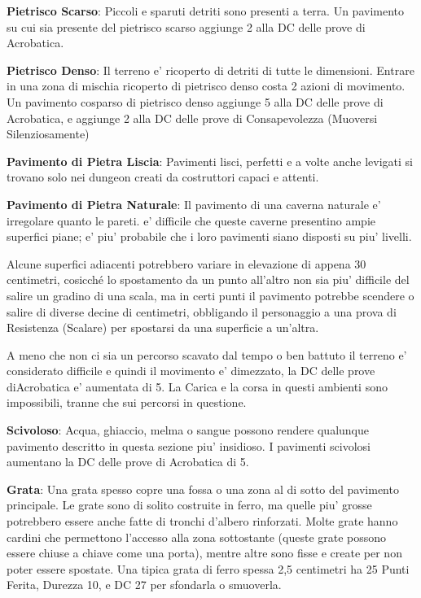 \documentclass[a4paper,11pt,twoside,openany]{dndbook}
\begin{document}
{\textbf{Pietrisco Scarso}: Piccoli e sparuti detriti sono presenti a terra. Un pavimento su cui sia presente del pietrisco scarso aggiunge 2 alla DC delle prove di Acrobatica.

\textbf{Pietrisco Denso}: Il terreno e' ricoperto di detriti di tutte le dimensioni. Entrare in una zona di mischia ricoperto di pietrisco denso costa 2 azioni di movimento. Un pavimento cosparso di pietrisco denso aggiunge 5 alla DC delle prove di Acrobatica, e aggiunge 2 alla DC delle prove di Consapevolezza (Muoversi Silenziosamente)

\textbf{Pavimento di Pietra Liscia}: Pavimenti lisci, perfetti e a volte anche levigati si trovano solo nei dungeon creati da costruttori capaci e attenti.

\textbf{Pavimento di Pietra Naturale}: Il pavimento di una caverna naturale e' irregolare quanto le pareti. e' difficile che queste caverne presentino ampie superfici piane; e' piu' probabile che i loro pavimenti siano disposti su piu' livelli. 

Alcune superfici adiacenti potrebbero variare in elevazione di appena 30 centimetri, cosicché lo spostamento da un punto all'altro non sia piu' difficile del salire un gradino di una scala, ma in certi punti il pavimento potrebbe scendere o salire di diverse decine di centimetri, obbligando il personaggio a una prova di Resistenza (Scalare) per spostarsi da una superficie a un'altra.

A meno che non ci sia un percorso scavato dal tempo o ben battuto il terreno e' considerato difficile e quindi il movimento e' dimezzato, la DC delle prove diAcrobatica e' aumentata di 5. La Carica e la corsa in questi ambienti sono impossibili, tranne che sui percorsi in questione.

\textbf{Scivoloso}: Acqua, ghiaccio, melma o sangue possono rendere qualunque pavimento descritto in questa sezione piu' insidioso. I pavimenti scivolosi aumentano la DC delle prove di Acrobatica di 5.

\textbf{Grata}: Una grata spesso copre una fossa o una zona al di sotto del pavimento principale. Le grate sono di solito costruite in ferro, ma quelle piu' grosse potrebbero essere anche fatte di tronchi d’albero rinforzati. Molte grate hanno cardini che permettono l’accesso alla zona sottostante (queste grate possono essere chiuse a chiave come una porta), mentre altre sono fisse e create per non poter essere spostate. Una tipica grata di ferro spessa 2,5 centimetri ha 25 Punti Ferita, Durezza 10, e DC 27 per sfondarla o smuoverla.

}
\end{document}
